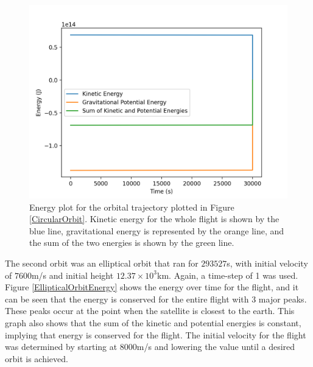 \documentclass{revtex4-2}
\begin{document}
\begin{figure}
    \includegraphics[width = 0.96\linewidth]{CircularOrbitEnergy.png}
    \caption{Energy plot for the orbital trajectory plotted in Figure \ref{CircularOrbit}. Kinetic energy for the whole flight is shown by the blue line, gravitational energy
        is represented by the orange line, and the sum of the two energies is shown by the green line.}
    \label{CircularOrbitEnergy}

\end{figure}
The second orbit was an elliptical orbit that ran for $293527$s, with initial velocity of $7600$m/s and initial height $12.37\times10^3$km. Again, a time-step of 1 was used. Figure \ref{EllipticalOrbitEnergy} shows the
energy over time for the flight, and it can be seen that the energy is conserved for the entire flight with 3 major peaks. These peaks occur at the point
when the satellite is closest to the earth. This graph also shows that the sum of the kinetic and potential energies is constant,
implying that energy is conserved for the flight. The initial velocity for the flight was determined by starting at $8000$m/s and lowering
the value until a desired orbit is achieved.
\end{document}
